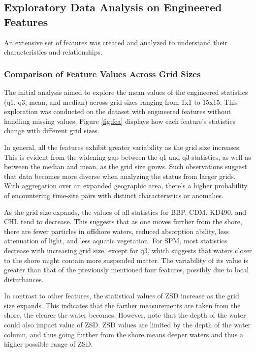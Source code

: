 \documentclass[a4paper,11pt]{report}
\begin{document}
\subsection{Exploratory Data Analysis on Engineered Features}

An extensive set of features was created and analyzed to understand their characteristics and relationships.

\subsubsection{Comparison of Feature Values Across Grid Sizes}

The initial analysis aimed to explore the mean values of the engineered statistics (q1, q3, mean, and median) across grid sizes ranging from 1x1 to 15x15. This exploration was conducted on the dataset with engineered features without handling missing values. Figure \ref{fig:fea} displays how each feature's statistics change with different grid sizes.

In general, all the features exhibit greater variability as the grid size increases. This is evident from the widening gap between the q1 and q3 statistics, as well as between the median and mean, as the grid size grows. Such observations suggest that data becomes more diverse when analyzing the status from larger grids. With aggregation over an expanded geographic area, there's a higher probability of encountering time-site pairs with distinct characteristics or anomalies.

As the grid size expands, the values of all statistics for BBP, CDM, KD490, and CHL tend to decrease. This suggests that as one moves further from the shore, there are fewer particles in offshore waters, reduced absorption ability, less attenuation of light, and less aquatic vegetation. For SPM, most statistics decrease with increasing grid size, except for q3, which suggests that waters closer to the shore might contain more suspended matter. The variability of its value is greater than that of the previously mentioned four features, possibly due to local disturbances.

In contrast to other features, the statistical values of ZSD increase as the grid size expands. This indicates that the farther measurements are taken from the shore, the clearer the water becomes. However, note that the depth of the water could also impact value of ZSD. ZSD values are limited by the depth of the water column, and thus going further from the shore means deeper waters and thus a higher possible range of ZSD. 
\end{document}

